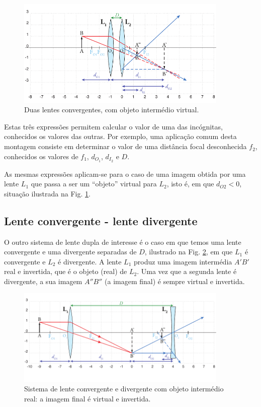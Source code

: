 \documentclass[12pt,a4paper,oneside]{paper}
\begin{document}
\begin{figure}[H]
	\centering 
	\includegraphics[width=0.9\textwidth]{./otica_images/10-DuplaConvConv2}
	\caption{Duas lentes convergentes, com objeto intermédio virtual. \label{fig:DuplaConvConv2}} 
\end{figure}

Estas três expressões permitem calcular o valor de uma das incógnitas, conhecidos os valores das outras. Por exemplo, uma
aplicação comum desta montagem consiste em determinar o valor de uma distância focal desconhecida $f_2$, conhecidos os valores
de $f_1$, $d_{O_1}$, $d_{I_2}$ e $D$.

As mesmas expressões aplicam-se para o caso de uma imagem obtida por uma lente $L_1$ que passa a ser um “objeto” virtual
para $L_2$, isto é, em que $d_{O2}<0$, situação ilustrada na Fig. \ref{fig:DuplaConvConv2}.



\subsection{\sf Lente convergente - lente divergente}
O outro sistema de lente dupla de interesse é o caso em que temos uma lente convergente e uma divergente separadas de $D$,
ilustrado na Fig. \ref{fig:DuplaConvDiv1}, em que $L_1$ é convergente e $L_2$ é divergente. A lente $L_1$ produz uma imagem
intermédia $A'B'$ real e invertida, que é o objeto (real) de $L_2$. Uma vez que a segunda lente é divergente, a sua imagem
$A''B''$ (a imagem final) é sempre virtual e invertida.

\begin{figure}[H] 
    \centering 
	\includegraphics[width=0.9\textwidth]{./otica_images/11-DuplaConvDiv1}
	\caption{Sistema de lente convergente e divergente  com objeto intermédio real: a imagem final é virtual e invertida.
    \label{fig:DuplaConvDiv1}} 
\end{figure}
\end{document}
